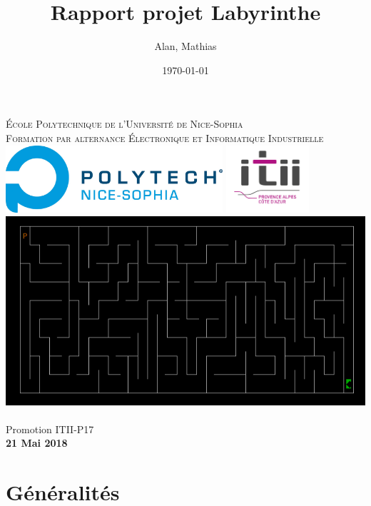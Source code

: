 \documentclass{book}
\title{Rapport projet Labyrinthe}
\author{\bsc{BATISTA} Alan, \bsc{GO} Mathias}
\date{\today} %
\begin{document}
\makeatletter
\begin{titlepage}
	\centering
		{\large \textsc{École Polytechnique de l'Université de Nice-Sophia}}\\
		\textsc{Formation par alternance Électronique et Informatique Industrielle}\\
	\vspace{1cm}
		\includegraphics[height=2.5cm]{rsrc/logo-polytech-sophia.jpg}
		\hfill
		\includegraphics[height=2.5cm]{rsrc/logo-itii-paca.jpg}
	\vfill
		{\LARGE \textbf{\@title}} \\
	\vspace{2em}
		\includegraphics[width=1\textwidth]{rsrc/figure-title.png} \\
	\vspace{2em}
		{\large \@author} \\
		{\large Promotion ITII-P17} \\
		{\large\textbf{21 Mai 2018}}
	\vfill
	
	
\end{titlepage}
\makeatother

\tableofcontents

\chapter{Généralités}
\end{document}
